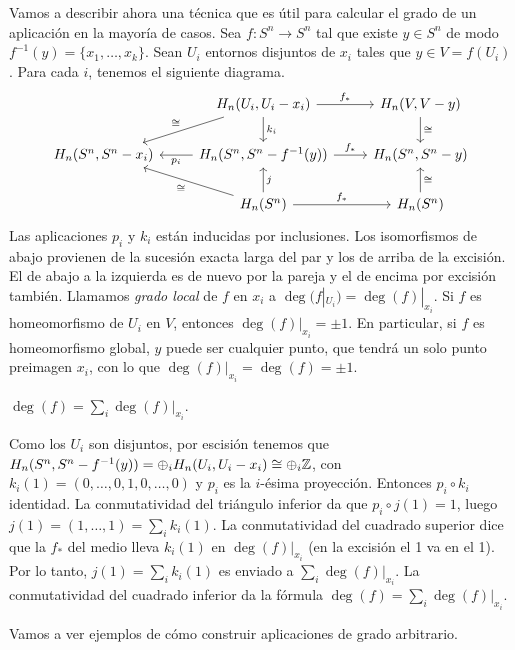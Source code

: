 \documentclass[TA.tex]{subfiles}
\begin{document}
Vamos a describir ahora una técnica que es útil para calcular el grado de un aplicación en la mayoría de casos. Sea $f:S^n\to S^n$ tal que existe $y\in S^n$ de modo $f^{-1}(y)=\{x_1,\dots, x_k\}$. Sean $U_i$ entornos disjuntos de $x_i$ tales que $y\in V=f(U_i)$. Para cada $i$, tenemos el siguiente diagrama. 
\[
\begin{tikzcd}
& H_n(U_i, U_i-x_i)\arrow[dl, "\cong"']\arrow[r, "f_*"]\arrow[d, "k_i"] & H_n(V, V-y)\arrow[d, "\cong"]\\
H_n(S^n, S^n-x_i) & H_n(S^n, S^n-f^{-1}(y))\arrow[l, "p_i"]\arrow[r, "f_*"] & H_n(S^n, S^n-y) \\
& H_n(S^n)\arrow[ul, "\cong"]\arrow[u, "j"']\arrow[r, "f_*"] & H_n(S^n)\arrow[u, "\cong"']
\end{tikzcd}
\]
Las aplicaciones $p_i$ y $k_i$ están inducidas por inclusiones. Los isomorfismos de abajo provienen de la sucesión exacta larga del par y los de arriba de la excisión. El de abajo a la izquierda es de nuevo por la pareja y el de encima por excisión también. Llamamos \emph{grado local} de $f$ en $x_i$ a $\deg(f|_{U_i})=\deg(f)|_{x_i}$. Si $f$ es homeomorfismo de $U_i$ en $V$, entonces $\deg(f)|_{x_i}=\pm 1$. En particular, si $f$ es homeomorfismo global, $y$ puede ser cualquier punto, que tendrá un solo punto preimagen $x_i$, con lo que $\deg(f)|_{x_i}=\deg(f)=\pm 1$.

\begin{prop}
$\deg(f)=\sum_i \deg(f)|_{x_i}$. 
\end{prop}
\begin{dem}
Como los $U_i$ son disjuntos, por escisión tenemos que $H_n(S^n, S^n-f^{-1}(y))=\oplus_i H_n(U_i, U_i-x_i)\cong\oplus_i\mathbb{Z}$, con $k_i(1)=(0,\dots,0, 1,0,\dots, 0)$ y $p_i$ es la $i$-ésima proyección. Entonces $p_i\circ k_i$ identidad. La conmutatividad del triángulo inferior da que $p_i\circ j(1)=1$, luego $j(1)=(1,\dots, 1)=\sum_ik_i(1)$. La conmutatividad del cuadrado superior dice que la $f_*$ del medio lleva $k_i(1)$ en $\deg(f)|_{x_i}$ (en la excisión el 1 va en el 1). Por lo tanto, $j(1)=\sum_ik_i(1)$ es enviado a $\sum_i \deg(f)|_{x_i}$. La conmutatividad del cuadrado inferior da la fórmula $\deg(f)=\sum_i \deg(f)|_{x_i}$.
\end{dem}

Vamos a ver ejemplos de cómo construir aplicaciones de grado arbitrario.
\end{document}
